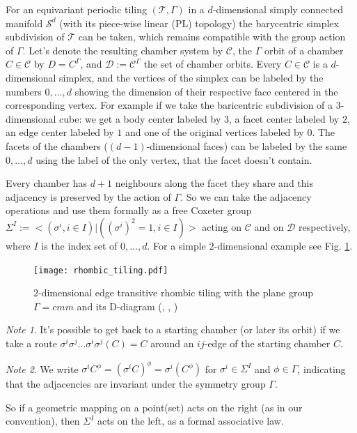 \documentclass[12pt,a4paper]{article}
\numberwithin{equation}{section}
\theoremstyle{plain}%
\theoremstyle{definition}
\theoremstyle{remark}
\newtheorem*{note}{Note}
\begin{document}
For an equivariant periodic tiling $(\mathcal{T},\Gamma)$ in a $d$-dimensional
simply connected manifold $\mathcal{S}^d$ (with its piece-wise linear (PL)
topology) the barycentric simplex subdivision of $\mathcal{T}$ can be taken,
which remains compatible with the group action of $\Gamma$. Let's denote the
resulting chamber system by $\mathcal{C}$, the $\Gamma$ orbit of a chamber $C\in
\mathcal{C}$ by $D=C^\Gamma$, and $\mathcal{D}:= \mathcal{C}^\Gamma$ the set of
chamber orbits. Every $C\in \mathcal{C}$ is a $d$-dimensional simplex, and the
vertices of the simplex can be labeled by the numbers $0,\ldots,d$ showing the
dimension of their respective face centered in the corresponding vertex. For
example if we take the baricentric subdivision of a $3$-dimensional cube: we get
a body center labeled by $3$, a facet center labeled by $2$, an edge center
labeled by $1$ and one of the original vertices labeled by $0$. The facets of
the chambers ($(d-1)$-dimensional faces) can be labeled by the same $0,\ldots,d$
using the label of the only vertex, that the facet doesn't contain.

Every chamber has $d+1$ neighbours along the facet they share and this adjacency is
preserved by the action of $\Gamma$. So we can take the adjacency operations and
use them formally as a free Coxeter group $\Sigma^I := <(\sigma^i, i\in I) |
((\sigma^i)^2=1, i\in I)>$ acting on $\mathcal{C}$ and on $\mathcal{D}$
respectively, where $I$ is the index set of $0,\ldots,d$. For a simple
$2$-dimensional example see Fig. \ref{fig:rhombic_tiling}.

\begin{figure}
  \caption{\label{fig:rhombic_tiling} $2$-dimensional edge transitive rhombic
  tiling with the plane group $\Gamma=cmm$ \cite{VS93} and its
  D-diagram (\usebox{\LegendVertex}, \usebox{\LegendEdge}, \usebox{\LegendFace})}
  \center
  \texttt{[image: rhombic\_tiling.pdf]}
\end{figure}

\begin{note}
  It's possible to get back to a starting chamber (or later its orbit) if we
  take a route $\sigma^i\sigma^j\ldots\sigma^i\sigma^j(C) = C$ around an
  $ij$-edge of the starting chamber $C$.
\end{note}

\begin{note}
  We write $\sigma^iC^\phi=(\sigma^iC)^\phi=\sigma^i(C^\phi)$ for
  $\sigma^i\in\Sigma^I$ and $\phi\in\Gamma$, indicating that the adjacencies are
  invariant under the symmetry group $\Gamma$.
  
  So if a geometric mapping on a point(set) acts on the right (as in our
  convention), then $\Sigma^I$ acts on the left, as a formal associative
  law.
\end{note}
\end{document}
